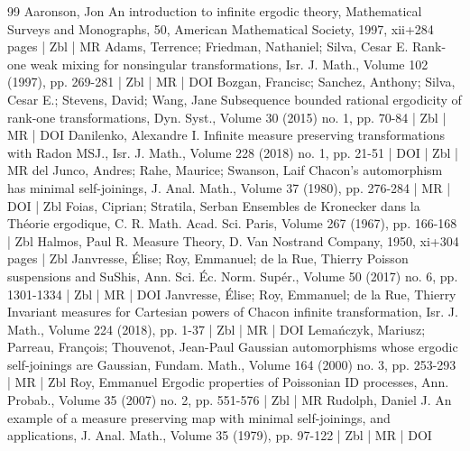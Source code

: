 \documentclass[10pt]{amsart}
\theoremstyle{definition}\newtheorem{defi}[theo]{Definition}\newtheorem{rema}[theo]{Remark}\newtheorem{exam}[theo]{Example}\newtheorem{exem}[theo]{Example}\newtheorem{nota}[theo]{Notation}
\begin{document}
\begin{thebibliography}{99}
Aaronson, Jon An introduction to infinite ergodic theory, Mathematical Surveys and Monographs, 50, American Mathematical Society, 1997, xii+284 pages | Zbl | MR
Adams, Terrence; Friedman, Nathaniel; Silva, Cesar E. Rank-one weak mixing for nonsingular transformations, Isr. J. Math., Volume 102 (1997), pp. 269-281 | Zbl | MR | DOI
Bozgan, Francisc; Sanchez, Anthony; Silva, Cesar E.; Stevens, David; Wang, Jane Subsequence bounded rational ergodicity of rank-one transformations, Dyn. Syst., Volume 30 (2015) no. 1, pp. 70-84 | Zbl | MR | DOI
Danilenko, Alexandre I. Infinite measure preserving transformations with Radon MSJ., Isr. J. Math., Volume 228 (2018) no. 1, pp. 21-51 | DOI | Zbl | MR
del Junco, Andres; Rahe, Maurice; Swanson, Laif Chacon’s automorphism has minimal self-joinings, J. Anal. Math., Volume 37 (1980), pp. 276-284 | MR | DOI | Zbl
Foias, Ciprian; Stratila, Serban Ensembles de Kronecker dans la Théorie ergodique, C. R. Math. Acad. Sci. Paris, Volume 267 (1967), pp. 166-168 | Zbl
Halmos, Paul R. Measure Theory, D. Van Nostrand Company, 1950, xi+304 pages | Zbl
Janvresse, Élise; Roy, Emmanuel; de la Rue, Thierry Poisson suspensions and SuShis, Ann. Sci. Éc. Norm. Supér., Volume 50 (2017) no. 6, pp. 1301-1334 | Zbl | MR | DOI
Janvresse, Élise; Roy, Emmanuel; de la Rue, Thierry Invariant measures for Cartesian powers of Chacon infinite transformation, Isr. J. Math., Volume 224 (2018), pp. 1-37 | Zbl | MR | DOI
Lemańczyk, Mariusz; Parreau, François; Thouvenot, Jean-Paul Gaussian automorphisms whose ergodic self-joinings are Gaussian, Fundam. Math., Volume 164 (2000) no. 3, pp. 253-293 | MR | Zbl
Roy, Emmanuel Ergodic properties of Poissonian ID processes, Ann. Probab., Volume 35 (2007) no. 2, pp. 551-576 | Zbl | MR
Rudolph, Daniel J. An example of a measure preserving map with minimal self-joinings, and applications, J. Anal. Math., Volume 35 (1979), pp. 97-122 | Zbl | MR | DOI
\end{thebibliography}
\end{document}
